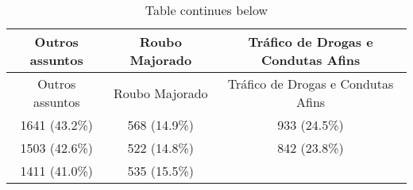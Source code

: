 \documentclass[10pt,]{article}
\begin{document}
\begin{longtable}[c]{@{}ccc@{}}
\caption{Table continues below}\tabularnewline
\toprule
\begin{minipage}[b]{0.23\columnwidth}\centering\strut
Outros assuntos
\strut\end{minipage} &
\begin{minipage}[b]{0.22\columnwidth}\centering\strut
Roubo Majorado
\strut\end{minipage} &
\begin{minipage}[b]{0.38\columnwidth}\centering\strut
Tráfico de Drogas e Condutas Afins
\strut\end{minipage}\tabularnewline
\midrule
\endfirsthead
\toprule
\begin{minipage}[b]{0.23\columnwidth}\centering\strut
Outros assuntos
\strut\end{minipage} &
\begin{minipage}[b]{0.22\columnwidth}\centering\strut
Roubo Majorado
\strut\end{minipage} &
\begin{minipage}[b]{0.38\columnwidth}\centering\strut
Tráfico de Drogas e Condutas Afins
\strut\end{minipage}\tabularnewline
\midrule
\endhead
\begin{minipage}[t]{0.23\columnwidth}\centering\strut
1641 (43.2\%)
\strut\end{minipage} &
\begin{minipage}[t]{0.22\columnwidth}\centering\strut
568 (14.9\%)
\strut\end{minipage} &
\begin{minipage}[t]{0.38\columnwidth}\centering\strut
933 (24.5\%)
\strut\end{minipage}\tabularnewline
\begin{minipage}[t]{0.23\columnwidth}\centering\strut
1503 (42.6\%)
\strut\end{minipage} &
\begin{minipage}[t]{0.22\columnwidth}\centering\strut
522 (14.8\%)
\strut\end{minipage} &
\begin{minipage}[t]{0.38\columnwidth}\centering\strut
842 (23.8\%)
\strut\end{minipage}\tabularnewline
\begin{minipage}[t]{0.23\columnwidth}\centering\strut
1411 (41.0\%)
\strut\end{minipage} &
\begin{minipage}[t]{0.22\columnwidth}\centering\strut
535 (15.5\%)

\end{minipage}
\end{longtable}
\end{document}
